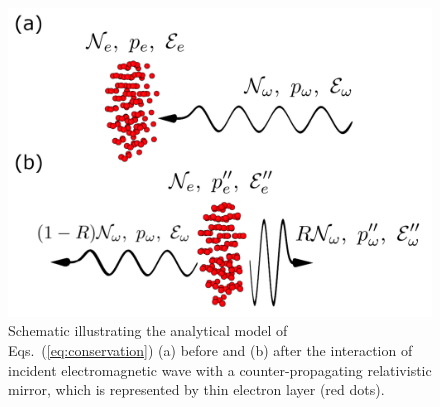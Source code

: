 \documentclass[10pt, a4paper, twoside, openright]{report}
\begin{document}

\begin{figure}[t]
	\includegraphics[width=0.45\linewidth]{img/recoil_scheme.png}
	\caption[]{\label{fig:recoil_schematic} Schematic illustrating the analytical model of Eqs.~(\ref{eq:conservation}) (a) before and (b) after the interaction of incident electromagnetic wave with a counter-propagating relativistic mirror, which is represented by thin electron layer (red dots).}
\end{figure}
\end{document}
